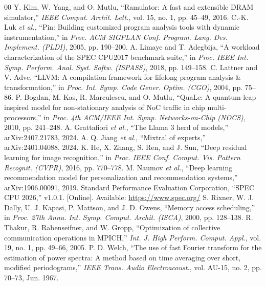 \documentclass[conference]{IEEEtran}
\begin{document}
\begin{thebibliography}{00}
 Y. Kim, W. Yang, and O. Mutlu, ``Ramulator: A fast and extensible DRAM simulator,'' \emph{IEEE Comput. Archit. Lett.}, vol. 15, no. 1, pp. 45--49, 2016.
 C.-K. Luk \emph{et al.}, ``Pin: Building customized program analysis tools with dynamic instrumentation,'' in \emph{Proc. ACM SIGPLAN Conf. Program. Lang. Des. Implement. (PLDI)}, 2005, pp. 190--200.
 A. Limaye and T. Adegbija, ``A workload characterization of the SPEC CPU2017 benchmark suite,'' in \emph{Proc. IEEE Int. Symp. Perform. Anal. Syst. Softw. (ISPASS)}, 2018, pp. 149--158.
 C. Lattner and V. Adve, ``LLVM: A compilation framework for lifelong program analysis \& transformation,'' in \emph{Proc. Int. Symp. Code Gener. Optim. (CGO)}, 2004, pp. 75--86.
 P. Bogdan, M. Kas, R. Marculescu, and O. Mutlu, ``QuaLe: A quantum-leap inspired model for non-stationary analysis of NoC traffic in chip multi-processors,'' in \emph{Proc. 4th ACM/IEEE Int. Symp. Networks-on-Chip (NOCS)}, 2010, pp. 241--248.
 A. Grattafiori \emph{et al.}, ``The Llama 3 herd of models,'' arXiv:2407.21783, 2024.
 A. Q. Jiang \emph{et al.}, ``Mixtral of experts,'' arXiv:2401.04088, 2024.
 K. He, X. Zhang, S. Ren, and J. Sun, ``Deep residual learning for image recognition,'' in \emph{Proc. IEEE Conf. Comput. Vis. Pattern Recognit. (CVPR)}, 2016, pp. 770--778.
 M. Naumov \emph{et al.}, ``Deep learning recommendation model for personalization and recommendation systems,'' arXiv:1906.00091, 2019.
 Standard Performance Evaluation Corporation, ``SPEC CPU 2026,'' v1.0.1. [Online]. Available: \url{https://www.spec.org/}
 S. Rixner, W. J. Dally, U. J. Kapasi, P. Mattson, and J. D. Owens, ``Memory access scheduling,'' in \emph{Proc. 27th Annu. Int. Symp. Comput. Archit. (ISCA)}, 2000, pp. 128--138.
 R. Thakur, R. Rabenseifner, and W. Gropp, ``Optimization of collective communication operations in MPICH,'' \emph{Int. J. High Perform. Comput. Appl.}, vol. 19, no. 1, pp. 49--66, 2005.
 P. D. Welch, ``The use of fast Fourier transform for the estimation of power spectra: A method based on time averaging over short, modified periodograms,'' \emph{IEEE Trans. Audio Electroacoust.}, vol. AU-15, no. 2, pp. 70--73, Jun. 1967.
\end{thebibliography}
\end{document}
